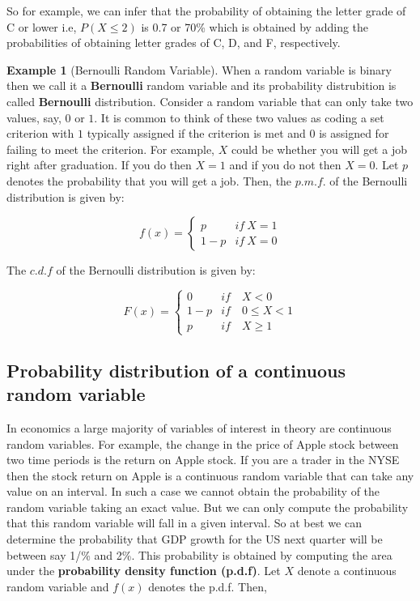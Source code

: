 \documentclass[
]{book}
\theoremstyle{definition}
\theoremstyle{definition}
\newtheorem{example}{Example}[chapter]
\theoremstyle{definition}
\theoremstyle{definition}
\theoremstyle{remark}
\begin{document}
So for example, we can infer that the probability of obtaining the letter grade of C or lower i.e, \(P(X\leq 2)\) is 0.7 or 70\% which is obtained by adding the probabilities of obtaining letter grades of C, D, and F, respectively.

\begin{example}[Bernoulli Random Variable]
\protect\hypertarget{exm:unnamed-chunk-29}{}\label{exm:unnamed-chunk-29}When a random variable is binary then we call it a \textbf{Bernoulli} random variable and its probability distrubition is called \textbf{Bernoulli} distribution. Consider a random variable that can only take two values, say, \(0\) or \(1\). It is common to think of these two values as coding a set criterion with \(1\) typically assigned if the criterion is met and \(0\) is assigned for failing to meet the criterion. For example, \(X\) could be whether you will get a job right after graduation. If you do then \(X=1\) and if you do not then \(X=0\). Let \(p\) denotes the probability that you will get a job. Then, the \(p.m.f.\) of the Bernoulli distribution is given by:

\[f(x)=\begin{cases}
    p & if \ X=1\\
    1-p & if \ X=0
     \end{cases}\]

The \(c.d.f\) of the Bernoulli distribution is given by:

\[F(x)=\begin{cases}
    0 & if \quad X < 0\\
    1-p & if \quad 0\leq X<1\\
    p & if \quad  X\geq 1
     \end{cases}\]
\end{example}

\hypertarget{probability-distribution-of-a-continuous-random-variable}{%
\subsection{Probability distribution of a continuous random variable}\label{probability-distribution-of-a-continuous-random-variable}}

In economics a large majority of variables of interest in theory are continuous random variables. For example, the change in the price of Apple stock between two time periods is the return on Apple stock. If you are a trader in the NYSE then the stock return on Apple is a continuous random variable that can take any value on an interval. In such a case we cannot obtain the probability of the random variable taking an exact value. But we can only compute the probability that this random variable will fall in a given interval. So at best we can determine the probability that GDP growth for the US next quarter will be between say 1/\% and 2\%. This probability is obtained by computing the area under the \textbf{probability density function (p.d.f)}. Let \(X\) denote a continuous random variable and \(f(x)\) denotes the p.d.f. Then,
\end{document}
